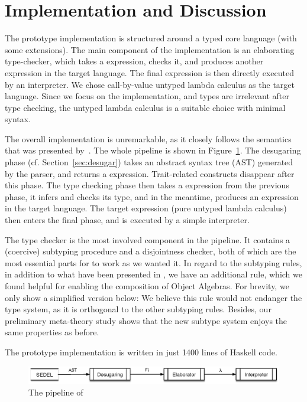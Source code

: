 \section{Implementation and Discussion}

The \name prototype implementation is structured around a typed core language
(\bname with some extensions). The main component of the implementation is an
elaborating type-checker, which takes a \bname expression, checks it, and
produces another expression in the target language. The final expression is then
directly executed by an interpreter. We chose call-by-value untyped lambda
calculus as the target language. Since we focus on the implementation, and types
are irrelevant after type checking, the untyped lambda calculus is a suitable choice
with minimal syntax.

The overall implementation is unremarkable, as it closely follows the semantics
that was presented by~\citet{alpuimdisjoint}. The whole pipeline is shown in
Figure~\ref{fig:pipeline}. The desugaring phase (cf. Section~\ref{sec:desugar})
takes an abstract syntax tree (AST) generated by the parser, and returns a
\bname expression. Trait-related constructs disappear after this phase. The type
checking phase then takes a \bname expression from the previous phase, it infers
and checks its type, and in the meantime, produces an expression in the target
language. The target expression (pure untyped lambda calculus) then enters the
final phase, and is executed by a simple interpreter.

The type checker is the most involved component in the pipeline. It contains a
(coercive) subtyping procedure and a disjointness checker, both of which are the
most essential parts for \name to work as we wanted it. In regard to the
subtyping rules, in addition to what have been presented in
\citet{alpuimdisjoint}, we have an additional rule, which we found
helpful for enabling the
composition of Object Algebras. For brevity, we only show a
simplified version below: \ottusedrule{\ottdruleSubXXR{}} 
We believe this rule would
not endanger the type system, as it is orthogonal to the other subtyping rules.
Besides, our preliminary meta-theory study shows that the new subtype system
enjoys the same properties as before.

The prototype implementation is written in just 1400 lines of Haskell code.

\begin{figure}[t]
  \centering
  \includegraphics[scale=0.9]{pipeline.eps}
  \caption{The pipeline of \name}
  \label{fig:pipeline}
\end{figure}